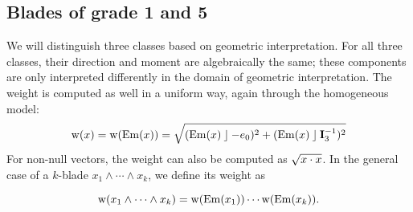 \subsection{Blades of grade 1 and 5}
We will distinguish three classes based on geometric interpretation.  For all three classes, their direction and moment are algebraically the same; these components are only interpreted differently in the domain of geometric interpretation.  The weight is computed as well in a uniform way, again through the homogeneous model:
\begin{equation*}
  \operatorname{w}(x) = 
      \operatorname{w}(\operatorname{Em}(x)) = \sqrt{(\operatorname{Em}(x) \mathbin{\rfloor} -e_0)^2 + (\operatorname{Em}(x) \mathbin{\rfloor} \mathbf{I}_3^{-1})^2} 
\end{equation*}
For non-null vectors, the weight can also be computed as $\sqrt{x \mathbin{\cdot} x}$.  In the general case of a $k$-blade $x_1 \wedge \cdots \wedge x_k$, we define its weight as 

\begin{equation*}
  \operatorname{w}(x_1 \wedge \cdots \wedge x_k) = \operatorname{w}(\operatorname{Em}(x_1)) \cdots \operatorname{w}(\operatorname{Em}(x_k)) .
\end{equation*}

